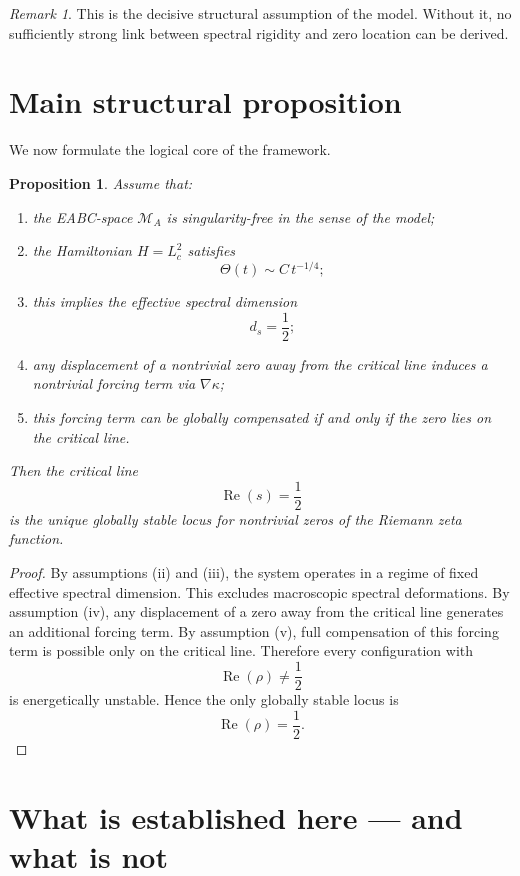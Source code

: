 \documentclass[11pt,a4paper]{amsart}
\theoremstyle{plain}
\newtheorem{proposition}[theorem]{Proposition}
\theoremstyle{definition}
\theoremstyle{remark}
\newtheorem{remark}[theorem]{Remark}
\newcommand{\RePart}{\operatorname{Re}}
\newcommand{\grad}{\nabla}
\newcommand{\MA}{\mathcal{M}_A}
\newcommand{\ThetaH}{\Theta}
\newcommand{\kappaF}{\kappa}
\newcommand{\Lc}{L_c}
\begin{document}
	\begin{remark}
		This is the decisive structural assumption of the model. Without it, no sufficiently strong link between spectral rigidity and zero location can be derived.
	\end{remark}
	
	\section{Main structural proposition}
	
	We now formulate the logical core of the framework.
	
	\begin{proposition}
		Assume that:
		\begin{enumerate}[label=(\roman*)]
			\item the EABC-space $\MA$ is singularity-free in the sense of the model;
			\item the Hamiltonian $H=\Lc^2$ satisfies
			\[
			\ThetaH(t)\sim C\,t^{-1/4};
			\]
			\item this implies the effective spectral dimension
			\[
			d_s=\frac12;
			\]
			\item any displacement of a nontrivial zero away from the critical line induces a nontrivial forcing term via $\grad\kappaF$;
			\item this forcing term can be globally compensated if and only if the zero lies on the critical line.
		\end{enumerate}
		Then the critical line
		\[
		\RePart(s)=\frac12
		\]
		is the unique globally stable locus for nontrivial zeros of the Riemann zeta function.
	\end{proposition}
	
	\begin{proof}
		By assumptions (ii) and (iii), the system operates in a regime of fixed effective spectral dimension. This excludes macroscopic spectral deformations. By assumption (iv), any displacement of a zero away from the critical line generates an additional forcing term. By assumption (v), full compensation of this forcing term is possible only on the critical line. Therefore every configuration with
		\[
		\RePart(\rho)\neq\frac12
		\]
		is energetically unstable. Hence the only globally stable locus is
		\[
		\RePart(\rho)=\frac12.
		\]
	\end{proof}
	
	\section{What is established here --- and what is not}
	
\end{document}
